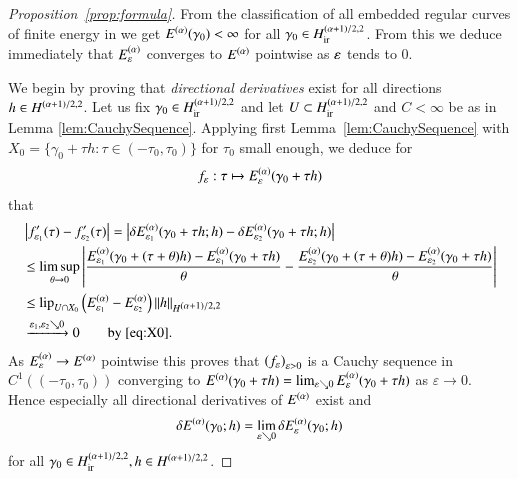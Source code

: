 \begin{proof}[Proposition~\ref{prop:formula}]
 From the classification of all embedded regular curves of finite energy in \cite{blatt:bre}
 we get $\E(\g_0) < \infty$ for all $\g_0 \in \Wir$.
 From this we deduce immediately that $\Ee$ converges to $\E$ pointwise as 
 $\eps$ tends to $0$.

 We begin by proving that \emph{directional derivatives} exist for all directions $h\in\W$.
 Let us fix $\gamma_0 \in \Wir$ and let $U \subset \Wir$ and $C< \infty$ be as in 
 Lemma \ref{lem:CauchySequence}.
 Applying first Lemma~\ref{lem:CauchySequence} with $X_0=\{\gamma_0 + \tau h: \tau \in (-\tau_0,\tau_0)\}$
 for $\tau_0$ small enough, we deduce for
 \[ f_\eps : \tau\mapsto \Ee(\g_0+\tau h) \]
 that
 \begin{align}
  &\abs{f_{\eps_1}'(\tau)-f_{\eps_2}'(\tau)}
  =\abs{\delta\Ee[\eps_1](\g_0+\tau h;h)-\delta\Ee[\eps_2](\g_0+\tau h;h)} \nonumber\\
  &\le\limsup_{\theta\to0}\abs{\frac{\Ee[\eps_1](\g_0+(\tau+\theta)h)-\Ee[\eps_1](\g_0+\tau h)}{\theta}
   - \frac{\Ee[\eps_2](\g_0+(\tau+\theta)h)-\Ee[\eps_2](\g_0+\tau h)}{\theta}} \nonumber\\  
  &\le \lip_{U\cap X_0}\br{\Ee[\eps_1]-\Ee[\eps_2]}\norm h_{\W}\label{eq:f-f}\\
  &\xrightarrow{\eps_1,\eps_2\searrow0}0\qquad\text{by \eqref{eq:X0}.}\nonumber
 \end{align}
 As $\Ee\to\E$ pointwise this proves that $\seq{f_\eps}$
 is a Cauchy sequence in $C^1((-\tau_0, \tau_0))$ converging to $\E(\gamma_0 + \tau h)=\lim_{\eps\searrow0}\Ee(\g_0+\tau h)$ as 
 $ \varepsilon \rightarrow 0$.
 Hence especially all directional derivatives of $\E$ exist and
 \begin{equation*}
  \delta \E (\gamma_0;h) = \lim_{\varepsilon \searrow 0} \delta \Ee (\gamma_0;h)
 \end{equation*}
 for all $\gamma_0 \in \Wir, h \in \W$.


\end{proof}
